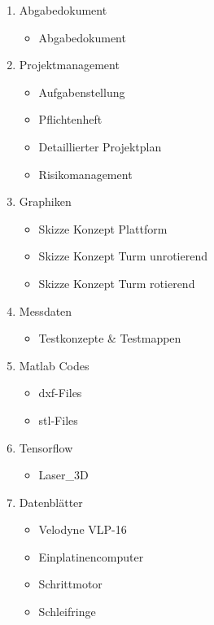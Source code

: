 \begin{enumerate}
	\item Abgabedokument
	\begin{itemize}
		\item Abgabedokument
	\end{itemize}
	\item Projektmanagement
	\begin{itemize}
		\item Aufgabenstellung
		\item Pflichtenheft
		\item Detaillierter Projektplan
		\item Risikomanagement
	\end{itemize}
	\item Graphiken
	\begin{itemize}
		\item Skizze Konzept Plattform
		\item Skizze Konzept Turm unrotierend
		\item Skizze Konzept Turm rotierend
	\end{itemize}
	\item Messdaten
	\begin{itemize}
	\item Testkonzepte \& Testmappen
	\end{itemize}
	\item Matlab Codes
	\begin{itemize}
		\item dxf-Files
		\item stl-Files
	\end{itemize}
	\item Tensorflow
	\begin{itemize}
		\item Laser\_3D
	\end{itemize}
	\item Datenblätter
	\begin{itemize}
		\item Velodyne VLP-16
		\item Einplatinencomputer
		\item Schrittmotor
		\item Schleifringe
	\end{itemize}
\end{enumerate}

\newpage



